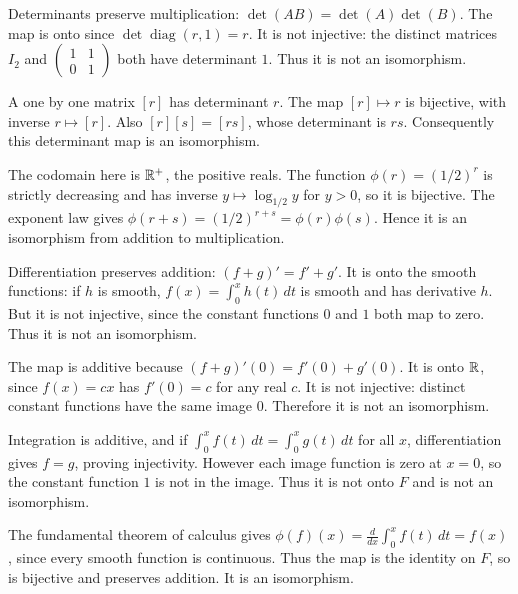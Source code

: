 
Determinants preserve multiplication: $\det(AB)=\det(A)\det(B)$. The map is onto since $\det\operatorname{diag}(r,1)=r$. It is not injective: the distinct matrices $I_2$ and $\begin{pmatrix}1&1\\0&1\end{pmatrix}$ both have determinant $1$. Thus it is not an isomorphism.


A one by one matrix $[r]$ has determinant $r$. The map $[r]\mapsto r$ is bijective, with inverse $r\mapsto[r]$. Also $[r][s]=[rs]$, whose determinant is $rs$. Consequently this determinant map is an isomorphism.


The codomain here is $\mathbb{R}^+$, the positive reals. The function $\phi(r)=(1/2)^r$ is strictly decreasing and has inverse $y\mapsto\log_{1/2}y$ for $y>0$, so it is bijective. The exponent law gives $\phi(r+s)=(1/2)^{r+s}=\phi(r)\phi(s)$. Hence it is an isomorphism from addition to multiplication.


Differentiation preserves addition: $(f+g)'=f'+g'$. It is onto the smooth functions: if $h$ is smooth, $f(x)=\int_0^x h(t)\,dt$ is smooth and has derivative $h$. But it is not injective, since the constant functions $0$ and $1$ both map to zero. Thus it is not an isomorphism.


The map is additive because $(f+g)'(0)=f'(0)+g'(0)$. It is onto $\mathbb{R}$, since $f(x)=cx$ has $f'(0)=c$ for any real $c$. It is not injective: distinct constant functions have the same image $0$. Therefore it is not an isomorphism.


Integration is additive, and if $\int_0^x f(t)\,dt=\int_0^x g(t)\,dt$ for all $x$, differentiation gives $f=g$, proving injectivity. However each image function is zero at $x=0$, so the constant function $1$ is not in the image. Thus it is not onto $F$ and is not an isomorphism.


The fundamental theorem of calculus gives $\phi(f)(x)=\frac{d}{dx}\int_0^x f(t)\,dt=f(x)$, since every smooth function is continuous. Thus the map is the identity on $F$, so is bijective and preserves addition. It is an isomorphism.

